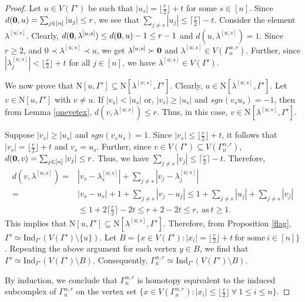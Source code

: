 \documentclass{amsart}
\theoremstyle{definition}
\theoremstyle{remark}
\numberwithin{equation}{section}
\newcommand{\f}{\lfloor\frac{r}{2}\rfloor}
\newcommand{\cil}{\lceil\frac{r}{2}\rceil}
\def\n{{\mathrm{N}}}
\begin{document}
\begin{proof}
	Let $u \in V(\Gamma')$ be such that $|u_s| = \f + t$ for some $s\in [n]$. Since $d({\bf{0}}, u)  = \sum_{j \in [n]} |u_j| \leq r$, we see that $\sum_{j \neq s} |u_j| \leq \cil - t$. 
	Consider the element $\lambda^{[u;s]}$. Clearly, $d({\bf{0}}, \lambda^{[u;s]}) \leq d({\bf{0}}, u)-1 \leq r-1$ and $d(u, \lambda^{[u;s]}) = 1$. Since  $r \geq 2$, and $0\prec \lambda^{[u;s]}\prec u$, we get  $\lambda^{[u;s]} \succ {\bf{0}}$ and  $\lambda^{[u;s]} \in V(\Gamma_n^{\alpha, r})$. Further, since $|\lambda^{[u;s]}_j| < \f +t $ for all $j \in [n]$, we have $\lambda^{[u;s]} \in V(\Gamma')$. 
	
	
	We now prove that $\n[u, \Gamma'] \subseteq \n[\lambda^{[x;s]}, \Gamma']$. Clearly, $u \in \n[\lambda^{[u;s]}, \Gamma']$. Let $v \in \n[u, \Gamma']$ with $v \neq u$. If $|v_s| < |u_s|$ or, $|v_s| \geq |u_s|$ and $sgn(v_s u_s) = -1$, then from Lemma \ref{onevetex}, $d(v, \lambda^{[u;s]}) \leq r$. Thus, in this case, $v \in \n[\lambda^{[u;s]}, \Gamma']$.
	
	Suppose $|v_s| \geq |u_s|$ and $sgn(v_s u_s) = 1$. Since $|v_s| \leq  \f + t$, it follows that $|v_s| = \f + t$ and $v_s = u_s$. Further, since $v\in V(\Gamma')\subseteq V(\Gamma_{n}^{\alpha,r})$, $d({\bf{0}}, v)=\sum_{j\in [n]}|v_j|\leq r$. Thus, we have $\sum_{j \neq s} |v_j| \leq \cil - t$. Therefore,
	\begin{align*}
		d(v,\lambda^{[u;s]}) = & |v_s - \lambda^{[u;s]}_s| + \sum_{j \neq s} |v_j - \lambda^{[u;s]}_j|\\
		= & |v_s - u_s| + 1 + \sum_{j \neq s} |v_j - u_j| \leq 1 + \sum_{j \neq s} |u_j| + \sum_{j \neq s} |v_j| \\
		& \leq 1 + 2\cil - 2t \leq  r + 2 - 2t \leq r, \ \text{as}\ t \geq 1.
	\end{align*}
	This implies that $\n[u, \Gamma'] \subseteq \n[\lambda^{[u;s]}, \Gamma']$. Therefore, from Proposition \ref{flag},
	$\Gamma'\simeq \mathrm{Ind}_{\Gamma'}(V(\Gamma')\setminus \{u\}).$
	Let $B=\{x\in V(\Gamma'):|x_i|=\f+t \ \text{for some}\ i\in [n] \}$. Repeating the above argument for each vertex $y\in B$, we find that $\Gamma'\simeq \mathrm{Ind}_{\Gamma'}(V(\Gamma')\setminus B)$. Consequently, $\Gamma_{n}^{\alpha,r}\simeq \mathrm{Ind}_{\Gamma'}(V(\Gamma')\setminus B)$. 
	
	
	By induction, we conclude that $\Gamma_{n}^{\alpha,r}$ is homotopy equivalent to the induced subcomplex of $\Gamma_{n}^{\alpha,r}$ on the vertex set 
	$\{x\in V(\Gamma_{n}^{\alpha,r}) : |x_i|\leq \f \ \forall \ 1\leq i\leq n\}$. 
\end{proof}
\end{document}
